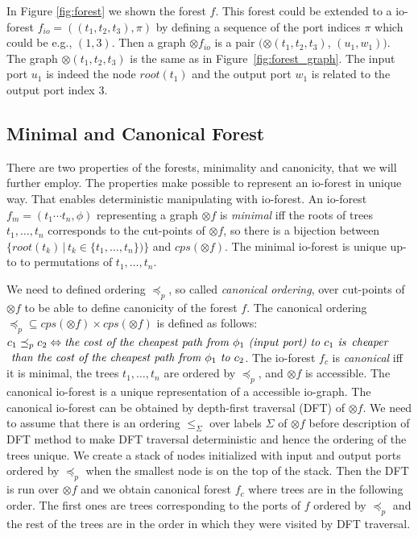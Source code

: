 In Figure \ref{fig:forest} we shown the forest $f$.
This forest could be extended to a io-forest $f_{io}=((t_1,t_2,t_3),\pi)$ 
by defining a sequence of the port indices $\pi$ which could be e.g., $(1,3)$.
Then a graph $\otimes f_{io}$ is a pair $(\otimes (t_1,t_2,t_3)$, $(u_1,w_1))$.
The graph $\otimes (t_1,t_2,t_3)$ is the same as in Figure~\ref{fig:forest_graph}.
The input port $u_1$ is indeed the node $root(t_1)$
and the output port $w_1$ is related to the output port index $3$.
\label{ex:iograph}
\eexmp

\subsection{Minimal and Canonical Forest}
\label{subsec:mcforest}

There are two properties of the forests, minimality and canonicity, that we will further employ.
The properties make possible to represent an io-forest in unique way.
That enables deterministic manipulating with io-forest.
An io-forest $f_m=(t_1 \cdots t_n, \phi)$ representing a graph $\otimes f$ is \emph{minimal}
iff the roots of trees $t_1,\ldots,t_n$ corresponds to the cut-points of $\otimes f$,
so there is a bijection between $\{root(t_k)\,|\, t_k \in \{t_1, \ldots, t_n\} )\}$ and $cps(\otimes f)$.
The minimal io-forest is unique up-to to permutations of $t_1,\ldots,t_n$.

We need to defined ordering $\preceq_p$, so called \emph{canonical ordering}, over cut-points of $\otimes f$ to be able to define canonicity of the forest $f$.
The canonical ordering $\preceq_p \subseteq cps(\otimes f) \times cps(\otimes f)$ is defined as follows: $c_1 \preceq_p c_2 \Leftrightarrow \emph{the cost of the cheapest path from }
\phi_1 \emph{ (input port) to } c_1 \emph{ is}$ $\emph{cheaper}$ $\emph{ than the cost of the cheapest path from } \phi_1 \emph{ to } c_2$.
The io-forest $f_c$ is \emph{canonical} iff it is minimal, the trees $t_1,\ldots, t_n$ are ordered by $\preceq_p$, and $\otimes f$ is accessible.
The canonical io-forest is a unique representation of a accessible io-graph.
The canonical io-forest can be obtained by depth-first traversal (DFT)\cite{taocp} of $\otimes f$.
We need to assume that there is an ordering $\leq_\Sigma$ over labels $\Sigma$ of $\otimes f$ before description of DFT method to
make DFT traversal deterministic and hence the ordering of the trees unique.
We create a stack of nodes initialized with input and output ports ordered by $\preceq_p$ when the smallest node is on the top of the stack.
Then the DFT is run over $\otimes f$ and we obtain canonical forest $f_c$ where trees are in the following order.
The first ones are trees corresponding to the ports of $f$ ordered by $\preceq_p$ and the rest of the trees are in the order
in which they were visited by DFT traversal.


